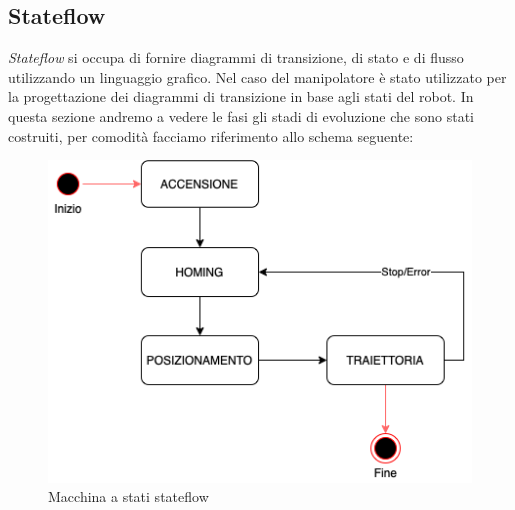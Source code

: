 \subsection{Stateflow}
\textit{Stateflow} si occupa di fornire diagrammi di transizione, di stato e di flusso utilizzando un linguaggio grafico. Nel caso del manipolatore è stato utilizzato per la progettazione dei diagrammi di transizione in base agli stati del robot. In questa sezione andremo a vedere le fasi gli stadi di evoluzione che sono stati costruiti, per comodità facciamo riferimento allo schema seguente:
\begin{figure}[ht]
	\begin{center}
		\includegraphics[scale=0.6]{Immagini/Sperimentale/statemachine}
		\caption{Macchina a stati stateflow
			\label{fig:macchinaStati}}
	\end{center}
\end{figure}

